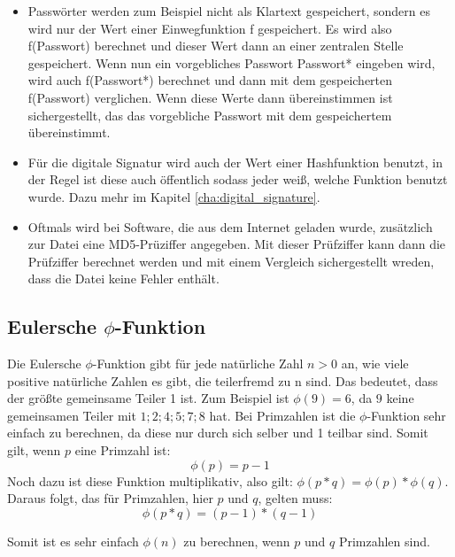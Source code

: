 \documentclass[12pt,a4paper]{scrartcl}
\begin{document}
	\begin{itemize}
	\item Passwörter werden zum Beispiel nicht als Klartext gespeichert, sondern es wird nur der Wert einer Einwegfunktion f gespeichert. Es wird also f(Passwort) berechnet und dieser Wert dann an einer zentralen Stelle gespeichert. Wenn nun ein vorgebliches Passwort Passwort* eingeben wird, wird auch f(Passwort*) berechnet und dann mit dem gespeicherten f(Passwort) verglichen. Wenn diese Werte dann übereinstimmen ist sichergestellt, das das vorgebliche Passwort mit dem gespeichertem übereinstimmt.  \cite[S.22]{Beutelspacher2015-jl}
	
	\item Für die digitale Signatur wird auch der Wert einer Hashfunktion benutzt, in der Regel ist diese auch öffentlich sodass jeder weiß, welche Funktion benutzt wurde. Dazu mehr im Kapitel \ref{cha:digital_signature}. \cite[S.16]{Beutelspacher2015-jl}
	
	\item Oftmals wird bei Software, die aus dem Internet geladen wurde, zusätzlich zur Datei eine MD5-Prüziffer angegeben. Mit dieser Prüfziffer kann dann die Prüfziffer berechnet werden und mit einem Vergleich sichergestellt wreden, dass die Datei keine Fehler enthält. \cite[S.81]{teschl2008mathematik}
	\end{itemize}
	
	\label{ch:einweg}
	\subsection{Eulersche $\phi$-Funktion}
	\label{cha:phi}
	
	Die Eulersche $\phi$-Funktion gibt für jede natürliche Zahl ${n > 0}$ an, wie viele positive natürliche Zahlen es gibt, die teilerfremd zu n sind. Das bedeutet, dass der größte gemeinsame Teiler 1 ist. \cite[S.106]{teschl2008mathematik} Zum Beispiel ist ${\phi(9) = 6}$, da ${9}$ keine gemeinsamen Teiler mit ${1; 2; 4; 5; 7; 8}$ hat. Bei Primzahlen ist die $\phi$-Funktion sehr einfach zu berechnen, da diese nur durch sich selber und 1 teilbar sind. Somit gilt, wenn $p$ eine Primzahl ist: $${\phi(p) = p - 1}$$
	Noch dazu ist diese Funktion multiplikativ, also gilt: ${\phi(p * q) = \phi(p) * \phi(q)}$.
	Daraus folgt, das für Primzahlen, hier $p$ und $q$, gelten muss:
	$${\phi(p * q) = (p - 1) * (q - 1)}$$
	
	Somit ist es sehr einfach $\phi(n)$ zu berechnen, wenn $p$ und $q$ Primzahlen sind.
		
\end{document}
